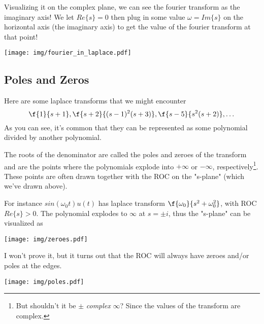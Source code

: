 \documentclass{article}
\newcommand{\0}{{\mathbf{0}}}
\begin{document}
Visualizing it on the complex plane, we can see the fourier transform as the imaginary axis! We let $Re\{ s \} = 0$ then
plug in some value $\omega = Im\{ s \}$ on the horizontal axis (the imaginary axis) to get the value of the fourier transform
at that point!

\begin{center}
  \texttt{[image: img/fourier\_in\_laplace.pdf]}
\end{center}



\clearpage

\subsection{Poles and Zeros}
Here are some laplace transforms that we might encounter
$$ \f{1}{s+1}, \f{s+2}{(s-1)^2(s+3)}, \f{s-5}{s^2(s+2)}, \dots $$
As you can see, it's common that they can be represented as some polynomial divided by another polynomial.

The roots of the denominator are called the poles and zeroes of the transform and are the points where
the polynomials explode into $+\infty$ or $-\infty$, respectively\footnote{But shouldn't it be $\pm$ \textit{complex} $\infty$?
Since the values of the transform are complex.}.
These points are often drawn together with the ROC on the "s-plane" (which we've drawn above).

For instance $sin(\omega_0 t)u(t)$ has laplace transform $\f {\omega_0}{s^2+\omega_0^2}$, with ROC $Re\{ s \} > 0$. The polynomial
explodes to $\infty$ at $s=\pm i$, thus the "s-plane" can be visualized as

\begin{center}
  \texttt{[image: img/zeroes.pdf]}
\end{center}

I won't prove it, but it turns out that the ROC will always have zeroes and/or poles at the edges.

\begin{center}
  \texttt{[image: img/poles.pdf]}
\end{center}
\end{document}
